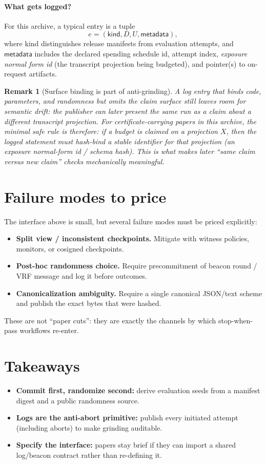 \documentclass[11pt]{article}
\newtheorem{remark}{Remark}
\begin{document}
\paragraph{What gets logged?}
For this archive, a typical entry is a tuple
\[
e = (\textsf{kind}, D, U, \textsf{metadata}),
\]
where \textsf{kind} distinguishes release manifests from evaluation attempts, and $\textsf{metadata}$ includes the declared spending schedule id, attempt index, \emph{exposure normal form id} (the transcript projection being budgeted), and pointer(s) to on-request artifacts.

\begin{remark}[Surface binding is part of anti-grinding]
A log entry that binds code, parameters, and randomness but omits the \emph{claim surface} still leaves room for semantic drift: the publisher can later present the same run as a claim about a different transcript projection.
For certificate-carrying papers in this archive, the minimal safe rule is therefore: if a budget is claimed on a projection $X$, then the logged statement must hash-bind a stable identifier for that projection (an exposure normal-form id / schema hash).
This is what makes later ``same claim versus new claim'' checks mechanically meaningful.
\end{remark}

\section{Failure modes to price}
The interface above is small, but several failure modes must be priced explicitly:
\begin{itemize}[leftmargin=1.2em]
\item \textbf{Split view / inconsistent checkpoints.} Mitigate with witness policies, monitors, or cosigned checkpoints.
\item \textbf{Post-hoc randomness choice.} Require precommitment of beacon round / VRF message and log it before outcomes.
\item \textbf{Canonicalization ambiguity.} Require a single canonical JSON/text scheme and publish the exact bytes that were hashed.
\end{itemize}
These are not ``paper cuts'': they are exactly the channels by which stop-when-pass workflows re-enter.

\section{Takeaways}
\begin{itemize}[leftmargin=*]
\item \textbf{Commit first, randomize second:} derive evaluation seeds from a manifest digest and a public randomness source.
\item \textbf{Logs are the anti-abort primitive:} publish every initiated attempt (including aborts) to make grinding auditable.
\item \textbf{Specify the interface:} papers stay brief if they can import a shared log/beacon contract rather than re-defining it.
\end{itemize}
\end{document}
